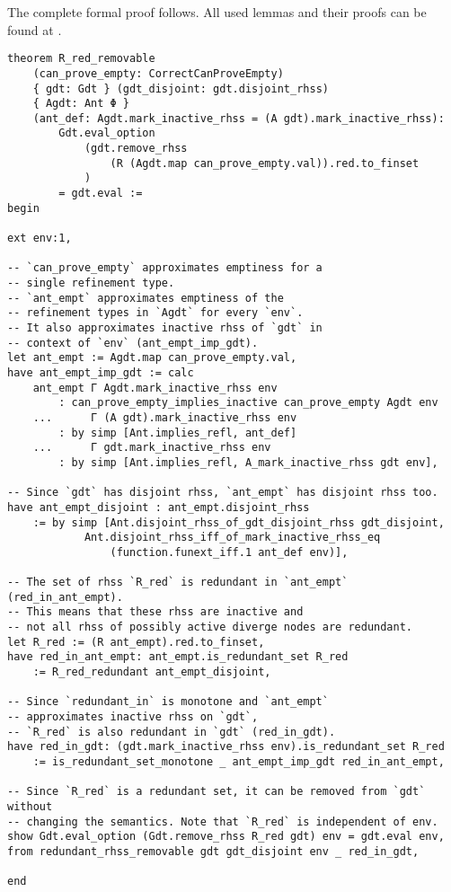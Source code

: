 The complete formal proof follows.
All used lemmas and their proofs can be found at \cite{leanProof}.
\begin{verbatim}
theorem R_red_removable
    (can_prove_empty: CorrectCanProveEmpty)
    { gdt: Gdt } (gdt_disjoint: gdt.disjoint_rhss)
    { Agdt: Ant Φ }
    (ant_def: Agdt.mark_inactive_rhss = (A gdt).mark_inactive_rhss):
        Gdt.eval_option
            (gdt.remove_rhss 
                (R (Agdt.map can_prove_empty.val)).red.to_finset
            )
        = gdt.eval :=
begin

ext env:1,

-- `can_prove_empty` approximates emptiness for a
-- single refinement type.
-- `ant_empt` approximates emptiness of the
-- refinement types in `Agdt` for every `env`.
-- It also approximates inactive rhss of `gdt` in
-- context of `env` (ant_empt_imp_gdt).
let ant_empt := Agdt.map can_prove_empty.val,
have ant_empt_imp_gdt := calc
    ant_empt Γ Agdt.mark_inactive_rhss env
        : can_prove_empty_implies_inactive can_prove_empty Agdt env
    ...      Γ (A gdt).mark_inactive_rhss env
        : by simp [Ant.implies_refl, ant_def]
    ...      Γ gdt.mark_inactive_rhss env 
        : by simp [Ant.implies_refl, A_mark_inactive_rhss gdt env],

-- Since `gdt` has disjoint rhss, `ant_empt` has disjoint rhss too.
have ant_empt_disjoint : ant_empt.disjoint_rhss
    := by simp [Ant.disjoint_rhss_of_gdt_disjoint_rhss gdt_disjoint,
            Ant.disjoint_rhss_iff_of_mark_inactive_rhss_eq
                (function.funext_iff.1 ant_def env)],

-- The set of rhss `R_red` is redundant in `ant_empt` (red_in_ant_empt).
-- This means that these rhss are inactive and
-- not all rhss of possibly active diverge nodes are redundant.
let R_red := (R ant_empt).red.to_finset,
have red_in_ant_empt: ant_empt.is_redundant_set R_red
    := R_red_redundant ant_empt_disjoint,

-- Since `redundant_in` is monotone and `ant_empt`
-- approximates inactive rhss on `gdt`,
-- `R_red` is also redundant in `gdt` (red_in_gdt).
have red_in_gdt: (gdt.mark_inactive_rhss env).is_redundant_set R_red
    := is_redundant_set_monotone _ ant_empt_imp_gdt red_in_ant_empt,

-- Since `R_red` is a redundant set, it can be removed from `gdt` without
-- changing the semantics. Note that `R_red` is independent of env.
show Gdt.eval_option (Gdt.remove_rhss R_red gdt) env = gdt.eval env,
from redundant_rhss_removable gdt gdt_disjoint env _ red_in_gdt,

end
\end{verbatim}

